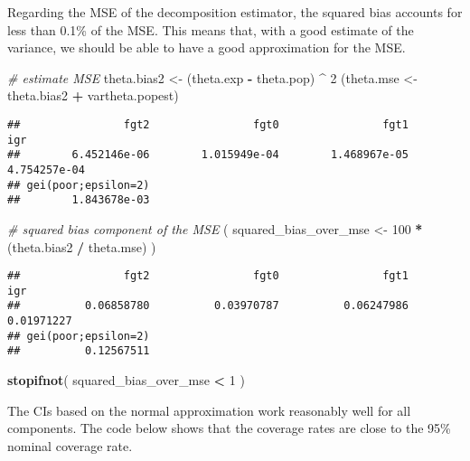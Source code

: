 \documentclass[
]{book}
\newenvironment{Shaded}{\begin{snugshade}}{\end{snugshade}}
\newcommand{\CommentTok}[1]{\textcolor[rgb]{0.56,0.35,0.01}{\textit{#1}}}
\newcommand{\DecValTok}[1]{\textcolor[rgb]{0.00,0.00,0.81}{#1}}
\newcommand{\FunctionTok}[1]{\textcolor[rgb]{0.13,0.29,0.53}{\textbf{#1}}}
\newcommand{\NormalTok}[1]{#1}
\newcommand{\OtherTok}[1]{\textcolor[rgb]{0.56,0.35,0.01}{#1}}
\newcommand{\SpecialCharTok}[1]{\textcolor[rgb]{0.81,0.36,0.00}{\textbf{#1}}}
\begin{document}
Regarding the MSE of the decomposition estimator, the squared bias accounts for less than 0.1\% of the MSE.
This means that, with a good estimate of the variance, we should be able to have a good approximation for the MSE.

\begin{Shaded}
\begin{Highlighting}[]
\CommentTok{\# estimate MSE}
\NormalTok{theta.bias2 }\OtherTok{\textless{}{-}}\NormalTok{ (theta.exp }\SpecialCharTok{{-}}\NormalTok{ theta.pop) }\SpecialCharTok{\^{}} \DecValTok{2}
\NormalTok{(theta.mse }\OtherTok{\textless{}{-}}\NormalTok{ theta.bias2 }\SpecialCharTok{+}\NormalTok{ vartheta.popest)}
\end{Highlighting}
\end{Shaded}

\begin{verbatim}
##                fgt2                fgt0                fgt1                 igr 
##        6.452146e-06        1.015949e-04        1.468967e-05        4.754257e-04 
## gei(poor;epsilon=2) 
##        1.843678e-03
\end{verbatim}

\begin{Shaded}
\begin{Highlighting}[]
\CommentTok{\# squared bias component of the MSE}
\NormalTok{( squared\_bias\_over\_mse }\OtherTok{\textless{}{-}} \DecValTok{100} \SpecialCharTok{*}\NormalTok{ (theta.bias2 }\SpecialCharTok{/}\NormalTok{ theta.mse) )}
\end{Highlighting}
\end{Shaded}

\begin{verbatim}
##                fgt2                fgt0                fgt1                 igr 
##          0.06858780          0.03970787          0.06247986          0.01971227 
## gei(poor;epsilon=2) 
##          0.12567511
\end{verbatim}

\begin{Shaded}
\begin{Highlighting}[]
\FunctionTok{stopifnot}\NormalTok{( squared\_bias\_over\_mse }\SpecialCharTok{\textless{}} \DecValTok{1}\NormalTok{ )}
\end{Highlighting}
\end{Shaded}

The CIs based on the normal approximation work reasonably well for all components. The code below shows that the coverage rates are close to the 95\% nominal coverage rate.
\end{document}
